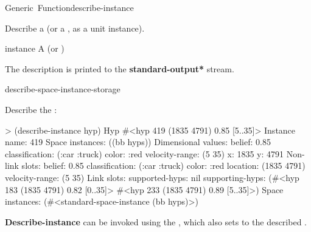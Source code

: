 \documentclass[10pt,twoside,english,pdftex]{article}
\begin{document}

\begin{functiondoc}{Generic~Function}{describe-instance}%
  {}
%
%
%

\fnsyntax

\fnpurpose Describe a  (or a
, as a unit instance).

\fnmethods
{}%
  {\code{(} }
\fnpackage {}

\fnmodule {}

\fnargs
\begin{args}{instance}
\arg[instance] A  (or )
\end{args}

\fndescription
{}%
The description is printed to the {\bf *standard-output*} stream.

\begin{alsos}{describe-space-instance-storage}
\end{alsos}

\fnexample
Describe the  :
%
\W\supp
\begin{example}
> (describe-instance hyp)
Hyp #<hyp 419 (1835 4791) 0.85 [5..35]>
  Instance name: 419
  Space instances: ((bb hyps))
  Dimensional values:
    belief:  0.85
    classification:  (:car :truck)
    color:  :red
    velocity-range:  (5 35)
    x:  1835
    y:  4791
  Non-link slots:
    belief:  0.85
    classification:  (:car :truck)
    color:  :red
    location:  (1835 4791)
    velocity-range:  (5 35)
  Link slots:
    supported-hyps:  nil
    supporting-hyps:  (#<hyp 183 (1835 4791) 0.82 [0..35]>
                       #<hyp 233 (1835 4791) 0.89 [5..35]>)
  Space instances: (#<standard-space-instance (bb hyps)>)
\end{example}

\fnnote 
%
%
%
\textbf{Describe-instance} can be invoked using the 
, which also sets \code{=} to the described .

\end{functiondoc}
\end{document}
